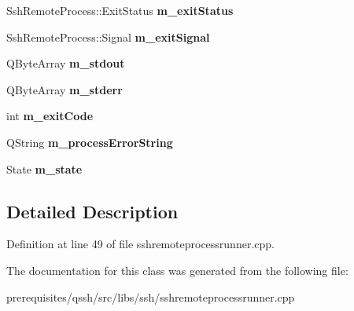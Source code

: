 \begin{DoxyCompactItemize}
Ssh\+Remote\+Process\+::\+Exit\+Status {\bfseries m\+\_\+exit\+Status}
\item 
\mbox{\label{class_q_ssh_1_1_internal_1_1_ssh_remote_process_runner_private_a1c04b20325547c0bcc13ccad621b1b4f}} 
Ssh\+Remote\+Process\+::\+Signal {\bfseries m\+\_\+exit\+Signal}
\item 
\mbox{\label{class_q_ssh_1_1_internal_1_1_ssh_remote_process_runner_private_a6dc90b925533f817d957e7da4457bc8a}} 
Q\+Byte\+Array {\bfseries m\+\_\+stdout}
\item 
\mbox{\label{class_q_ssh_1_1_internal_1_1_ssh_remote_process_runner_private_abb485ef21149e910923b3027b2b1e0a0}} 
Q\+Byte\+Array {\bfseries m\+\_\+stderr}
\item 
\mbox{\label{class_q_ssh_1_1_internal_1_1_ssh_remote_process_runner_private_aa101365a2c9e604461d40e4b2f28efc6}} 
int {\bfseries m\+\_\+exit\+Code}
\item 
\mbox{\label{class_q_ssh_1_1_internal_1_1_ssh_remote_process_runner_private_af4a08c592727829bad4ddb8dafd20f37}} 
Q\+String {\bfseries m\+\_\+process\+Error\+String}
\item 
\mbox{\label{class_q_ssh_1_1_internal_1_1_ssh_remote_process_runner_private_ab39cb789abbb91a3ee86a810e584cc69}} 
State {\bfseries m\+\_\+state}
\end{DoxyCompactItemize}


\subsection{Detailed Description}


Definition at line 49 of file sshremoteprocessrunner.\+cpp.



The documentation for this class was generated from the following file\+:\begin{DoxyCompactItemize}
\item 
prerequisites/qssh/src/libs/ssh/sshremoteprocessrunner.\+cpp\end{DoxyCompactItemize}
